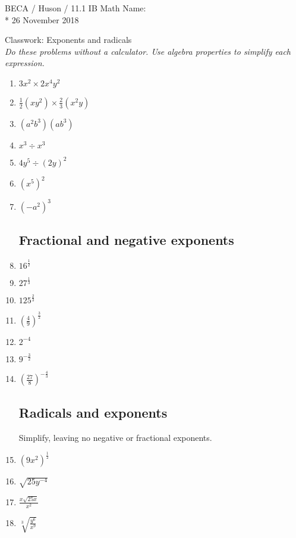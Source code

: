 \documentclass[]{book}
\begin{document}
\noindent BECA / Huson / 11.1 IB Math \hspace{2in} Name:\\*
26 November 2018
\begin{center}
{\Large Classwork: Exponents and radicals}\\
\textit{Do these problems without a calculator. Use algebra properties to simplify each expression.}
\end{center}


\begin{enumerate}

\subsection*{Exponent rules}

\item $3x^2 \times 2x^4y^2$
\item $\displaystyle \frac{1}{2} (xy^2) \times \frac{2}{3}(x^2y)$
\item $(a^2b^3)(ab^3)$
\item $x^3 \div x^3$
\item $4y^5 \div (2y)^2$
\item $(x^5)^2$
\item $(-a^2)^3$

\subsection*{Fractional and negative exponents}

\item $\displaystyle  16^\frac{1}{2}$
\item $\displaystyle  27^\frac{1}{3}$
\item $\displaystyle  125^\frac{2}{3}$
\item $\displaystyle  (\frac{4}{9})^\frac{3}{2}$
\item $2^{-4}$
\item $9^{-\frac{3}{2}}$
\item $(\frac{27}{8})^{-\frac{4}{3}}$

\subsection*{Radicals and exponents}
Simplify, leaving no negative or fractional exponents.

\item $(9x^2)^\frac{1}{2}$
\item $\sqrt{25y^{-4}}$
\item $\displaystyle  \frac{x \sqrt{25x}}{x^{2}}$
\item $\displaystyle  \sqrt[3]{\frac{y^6}{x^{9}}}$





\end{enumerate}
\end{document}
